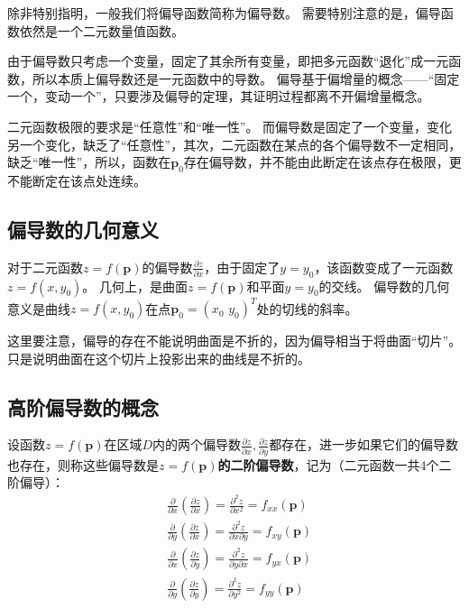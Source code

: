 除非特别指明，一般我们将偏导函数简称为偏导数。
需要特别注意的是，偏导函数依然是一个二元数量值函数。

由于偏导数只考虑一个变量，固定了其余所有变量，即把多元函数“退化”成一元函数，所以本质上偏导数还是一元函数中的导数。
偏导基于偏增量的概念——“固定一个，变动一个”，只要涉及偏导的定理，其证明过程都离不开偏增量概念。

二元函数极限的要求是“任意性”和“唯一性”。
而偏导数是固定了一个变量，变化另一个变化，缺乏了“任意性”，其次，二元函数在某点的各个偏导数不一定相同，缺乏“唯一性”，所以，函数在$\boldsymbol{p}_0$存在偏导数，并不能由此断定在该点存在极限，更不能断定在该点处连续。

\subsection{偏导数的几何意义}

对于二元函数$z=f\left( \boldsymbol{p} \right) $的偏导数$\frac{\partial z}{\partial x}$，由于固定了$y=y_0$，该函数变成了一元函数$z=f\left( x,y_0 \right) $。
几何上，是曲面$z=f\left( \boldsymbol{p} \right) $和平面$y=y_0$的交线。
偏导数的几何意义是曲线$z=f\left( x,y_0 \right) $在点$\boldsymbol{p}_0=\left( x_0\,\,y_0 \right) ^T$处的切线的斜率。

这里要注意，偏导的存在不能说明曲面是不折的，因为偏导相当于将曲面“切片”。
只是说明曲面在这个切片上投影出来的曲线是不折的。

\subsection{高阶偏导数的概念}

\begin{definition}[二阶偏导数]
设函数$z=f\left( \boldsymbol{p} \right) $在区域$D$内的两个偏导数$\frac{\partial z}{\partial x},\frac{\partial z}{\partial y}$都存在，进一步如果它们的偏导数也存在，则称这些偏导数是{\bf $z=f\left( \boldsymbol{p} \right) $的二阶偏导数}，记为（二元函数一共4个二阶偏导）：
\begin{align*}
&\frac{\partial}{\partial x}\left( \frac{\partial z}{\partial x} \right) =\frac{\partial ^2z}{\partial x^2}=f_{xx}\left( \boldsymbol{p} \right) \\
&\frac{\partial}{\partial y}\left( \frac{\partial z}{\partial x} \right) =\frac{\partial ^2z}{\partial x\partial y}=f_{xy}\left( \boldsymbol{p} \right) \\
&\frac{\partial}{\partial x}\left( \frac{\partial z}{\partial y} \right) =\frac{\partial ^2z}{\partial y\partial x}=f_{yx}\left( \boldsymbol{p} \right) \\
&\frac{\partial}{\partial y}\left( \frac{\partial z}{\partial y} \right) =\frac{\partial ^2z}{\partial y^2}=f_{yy}\left( \boldsymbol{p} \right)
\end{align*}
\end{definition}

